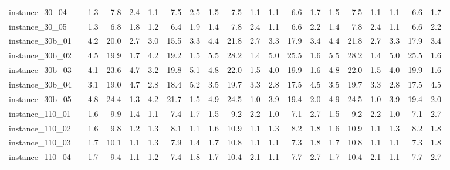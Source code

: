 \documentclass[12pt,a4paper,openright,twoside]{book}
\begin{document}
\begin{table}[H]
{\begin{tabular}{|ll|rrrrrr|rrrrrr|rrrrrr|}
instance\_30\_04              &     &   1.3  &   7.8   &  2.4  &   1.1  &   7.5   &  2.5  &   1.5  &   7.5   &  1.1  &   1.1  &   6.6   &  1.7  &   1.5  &   7.5   &  1.1  &   1.1  &   6.6   &  1.7 \\   
instance\_30\_05              &     &   1.3  &   6.8   &  1.8  &   1.2  &   6.4   &  1.9  &   1.4  &   7.8   &  2.4  &   1.1  &   6.6   &  2.2  &   1.4  &   7.8   &  2.4  &   1.1  &   6.6   &  2.2 \\   
instance\_30b\_01              &     &   4.2  &   20.0  &  2.7  &   3.0  &   15.5  &  3.3  &   4.4  &   21.8  &  2.7  &   3.3  &   17.9  &  3.4  &   4.4  &   21.8  &  2.7  &   3.3  &   17.9  &  3.4 \\   
instance\_30b\_02              &     &   4.5  &   19.9  &  1.7  &   4.2  &   19.2  &  1.5  &   5.5  &   28.2  &  1.4  &   5.0  &   25.5  &  1.6  &   5.5  &   28.2  &  1.4  &   5.0  &   25.5  &  1.6 \\   
instance\_30b\_03              &     &   4.1  &   23.6  &  4.7  &   3.2  &   19.8  &  5.1  &   4.8  &   22.0  &  1.5  &   4.0  &   19.9  &  1.6  &   4.8  &   22.0  &  1.5  &   4.0  &   19.9  &  1.6 \\   
instance\_30b\_04              &     &   3.1  &   19.0  &  4.7  &   2.8  &   18.4  &  5.2  &   3.5  &   19.7  &  3.3  &   2.8  &   17.5  &  4.5  &   3.5  &   19.7  &  3.3  &   2.8  &   17.5  &  4.5 \\   
instance\_30b\_05              &     &   4.8  &   24.4  &  1.3  &   4.2  &   21.7  &  1.5  &   4.9  &   24.5  &  1.0  &   3.9  &   19.4  &  2.0  &   4.9  &   24.5  &  1.0  &   3.9  &   19.4  &  2.0 \\   
instance\_110\_01             &     &   1.6  &   9.9   &  1.4  &   1.1  &   7.4   &  1.7  &   1.5  &   9.2   &  2.2  &   1.0  &   7.1   &  2.7  &   1.5  &   9.2   &  2.2  &   1.0  &   7.1   &  2.7  \\     
instance\_110\_02             &     &   1.6  &   9.8   &  1.2  &   1.3  &   8.1   &  1.1  &   1.6  &   10.9  &  1.1  &   1.3  &   8.2   &  1.8  &   1.6  &   10.9  &  1.1  &   1.3  &   8.2   &  1.8  \\     
instance\_110\_03             &     &   1.7  &   10.1  &  1.1  &   1.3  &   7.9   &  1.4  &   1.7  &   10.8  &  1.1  &   1.1  &   7.3   &  1.8  &   1.7  &   10.8  &  1.1  &   1.1  &   7.3   &  1.8  \\     
instance\_110\_04             &     &   1.7  &   9.4   &  1.1  &   1.2  &   7.4   &  1.8  &   1.7  &   10.4  &  2.1  &   1.1  &   7.7   &  2.7  &   1.7  &   10.4  &  2.1  &   1.1  &   7.7   &  2.7  \\     

\end{tabular}}
\end{table}
\end{document}
